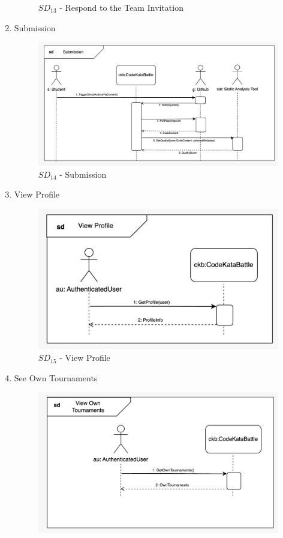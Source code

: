 \begin{enumerate}
\begin{figure}[H]
        \caption{$SD_{13}$ - Respond to the Team Invitation}
    \end{figure}
    \item Submission
    \begin{figure}[H]
        \centering
        \includegraphics[scale=0.2]{Images/sequence_diagrams/SD-submission.jpeg}
        \caption{$SD_{14}$ - Submission}
    \end{figure}
    \newpage
    \item View Profile
    \begin{figure}[H]
        \centering
        \includegraphics[scale=0.2]{Images/sequence_diagrams/SD-view_profile.jpeg}
        \caption{$SD_{15}$ - View Profile}
    \end{figure}
    \item See Own Tournaments
    \begin{figure}[H]
        \centering
        \includegraphics[scale=0.2]{Images/sequence_diagrams/SD-view_own_tournaments.jpeg}

\end{figure}
\end{enumerate}
